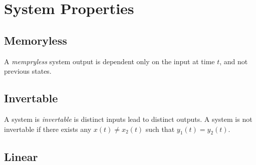 \section{System Properties}

\subsection{Memoryless}
A \emph{mempryless} system output is dependent
only on the input at time $t$, and not previous states.

\subsection{Invertable}
A system is \emph{invertable} is distinct
inputs lead to distinct outputs. A system is not
invertable if there exists any $x(t) \neq x_2(t)$ such
that $y_1(t) = y_2(t)$.

\subsection{Linear}

